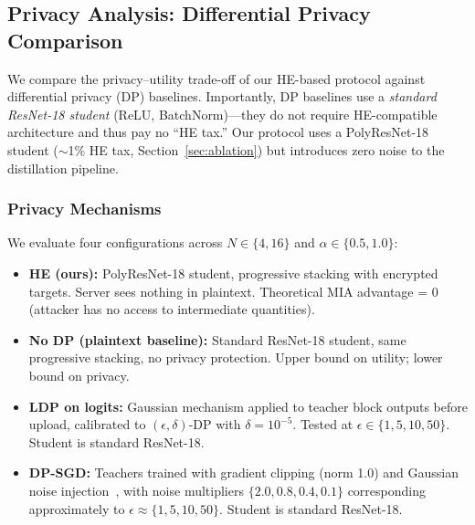\subsection{Privacy Analysis: Differential Privacy Comparison}
\label{sec:dp_comparison}

%
%
%
%
%


 
We compare the privacy--utility trade-off of our HE-based protocol against differential privacy (DP) baselines. Importantly, DP baselines use a \textit{standard ResNet-18 student} (ReLU, BatchNorm)---they do not require HE-compatible architecture and thus pay no ``HE tax.'' Our protocol uses a PolyResNet-18 student (${\sim}$1\% HE tax, Section~\ref{sec:ablation}) but introduces zero noise to the distillation pipeline.
 
\subsubsection{Privacy Mechanisms}
 
We evaluate four configurations across $N \in \{4, 16\}$ and $\alpha \in \{0.5, 1.0\}$:
 
\begin{itemize}
    \item \textbf{HE (ours):} PolyResNet-18 student, progressive stacking with encrypted targets. Server sees nothing in plaintext. Theoretical MIA advantage = 0 (attacker has no access to intermediate quantities).
    \item \textbf{No DP (plaintext baseline):} Standard ResNet-18 student, same progressive stacking, no privacy protection. Upper bound on utility; lower bound on privacy.
    \item \textbf{LDP on logits:} Gaussian mechanism applied to teacher block outputs before upload, calibrated to $(\epsilon, \delta)$-DP with $\delta = 10^{-5}$. Tested at $\epsilon \in \{1, 5, 10, 50\}$. Student is standard ResNet-18.
    \item \textbf{DP-SGD:} Teachers trained with gradient clipping (norm 1.0) and Gaussian noise injection~\cite{abadi2016deep}, with noise multipliers $\{2.0, 0.8, 0.4, 0.1\}$ corresponding approximately to $\epsilon \approx \{1, 5, 10, 50\}$. Student is standard ResNet-18.
\end{itemize}
 
